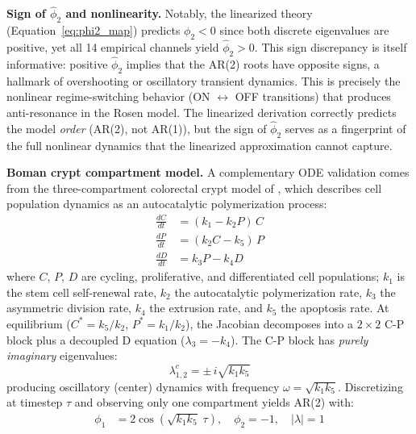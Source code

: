 \documentclass[11pt,letterpaper]{article}
\begin{document}
\textbf{Sign of $\hat{\phi}_2$ and nonlinearity.} Notably, the linearized theory (Equation~\ref{eq:phi2_map}) predicts $\phi_2 < 0$ since both discrete eigenvalues are positive, yet all 14 empirical channels yield $\hat{\phi}_2 > 0$. This sign discrepancy is itself informative: positive $\hat{\phi}_2$ implies that the AR(2) roots have opposite signs, a hallmark of overshooting or oscillatory transient dynamics. This is precisely the nonlinear regime-switching behavior (ON $\leftrightarrow$ OFF transitions) that produces anti-resonance in the Rosen model. The linearized derivation correctly predicts the model \textit{order} (AR(2), not AR(1)), but the sign of $\hat{\phi}_2$ serves as a fingerprint of the full nonlinear dynamics that the linearized approximation cannot capture.

\textbf{Boman crypt compartment model.} A complementary ODE validation comes from the three-compartment colorectal crypt model of \citet{boman2025}, which describes cell population dynamics as an autocatalytic polymerization process:
\begin{align}
\frac{dC}{dt} &= (k_1 - k_2 P)\,C \label{eq:boman_C} \\
\frac{dP}{dt} &= (k_2 C - k_5)\,P \label{eq:boman_P} \\
\frac{dD}{dt} &= k_3 P - k_4 D \label{eq:boman_D}
\end{align}
where $C$, $P$, $D$ are cycling, proliferative, and differentiated cell populations; $k_1$ is the stem cell self-renewal rate, $k_2$ the autocatalytic polymerization rate, $k_3$ the asymmetric division rate, $k_4$ the extrusion rate, and $k_5$ the apoptosis rate. At equilibrium ($C^* = k_5/k_2$, $P^* = k_1/k_2$), the Jacobian decomposes into a $2 \times 2$ C-P block plus a decoupled D equation ($\lambda_3 = -k_4$). The C-P block has \textit{purely imaginary} eigenvalues:
\begin{equation}
\lambda_{1,2}^c = \pm\, i\sqrt{k_1 k_5}
\label{eq:boman_eigenvalues}
\end{equation}
producing oscillatory (center) dynamics with frequency $\omega = \sqrt{k_1 k_5}$. Discretizing at timestep $\tau$ and observing only one compartment yields AR(2) with:
\begin{align}
\phi_1 &= 2\cos\!\left(\sqrt{k_1 k_5}\;\tau\right), \quad
\phi_2 = -1, \quad
|\lambda| = 1
\label{eq:boman_ar2}
\end{align}
\end{document}
